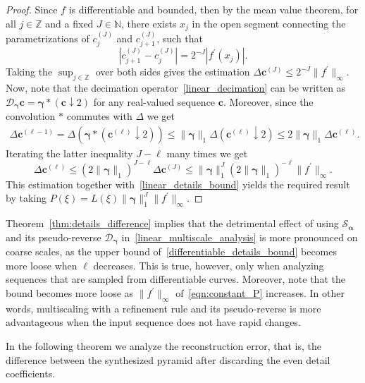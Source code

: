 \documentclass[12pt]{article}
\begin{document}
\begin{proof}
    Since $f$ is differentiable and bounded, then by the mean value theorem, for all $j\in\mathbb{Z}$ and a fixed $J\in\mathbb{N}$, there exists $x_j$ in the open segment connecting the parametrizations of $c^{(J)}_j$ and $c^{(J)}_{j+1}$, such that 
    $$|c^{(J)}_{j+1}-c^{(J)}_{j}| = 2^{-J}|f^\prime (x_j)|.$$
    Taking the $\sup_{j\in\mathbb{Z}}$ over both sides gives the estimation $\Delta \boldsymbol{c}^{(J)} \leq 2^{-J}\|f^\prime\|_\infty$. Now, note that the decimation operator~\eqref{linear_decimation} can be written as $\mathcal{D}_{\boldsymbol{\gamma}}\boldsymbol{c} = \boldsymbol{\gamma} * (\boldsymbol{c}\downarrow 2)$ for any real-valued sequence $\boldsymbol{c}$. Moreover,
    since the convolution $*$ commutes with $\Delta$ we get
    \begin{align*}
        \Delta\boldsymbol{c}^{(\ell-1)} = \Delta(\boldsymbol{\gamma}*(\boldsymbol{c}^{(\ell)}\downarrow 2)) \leq \|\boldsymbol{\gamma}\|_1\Delta(\boldsymbol{c}^{(\ell)}\downarrow 2)\leq 2 \|\boldsymbol{\gamma}\|_1\Delta\boldsymbol{c}^{(\ell)}.
    \end{align*}
    Iterating the latter inequality $J-\ell$ many times we get
    $$\Delta\boldsymbol{c}^{(\ell)} \leq (2 \|\boldsymbol{\gamma}\|_1)^{J-\ell}\Delta\boldsymbol{c}^{(J)}\leq \|\boldsymbol{\gamma}\|_1^J(2\|\boldsymbol{\gamma}\|_1)^{-\ell}\|f^\prime\|_\infty.$$
    This estimation together with~\eqref{linear_details_bound} yields the required result by taking $P(\xi)=L(\xi)\|\boldsymbol{\gamma}\|^J_1\|f^\prime\|_\infty$.
\end{proof}

Theorem~\ref{thm:details_difference} implies that the detrimental effect of using $\mathcal{S}_{\boldsymbol{\alpha}}$ and its pseudo-reverse $\mathcal{D}_{\boldsymbol{\gamma}}$ in~\eqref{linear_multiscale_analysis} is more pronounced on coarse scales, as the upper bound of~\eqref{differentiable_details_bound} becomes more loose when $\ell$ decreases. This is true, however, only when analyzing sequences that are sampled from differentiable curves. Moreover, note that the bound becomes more loose as $\|f^\prime\|_\infty$ of~\eqref{eqn:constant_P} increases. In other words, multiscaling with a refinement rule and its pseudo-reverse is more advantageous when the input sequence does not have rapid changes.

In the following theorem we analyze the reconstruction error, that is, the difference between the synthesized pyramid after discarding the even detail coefficients.
\end{document}
